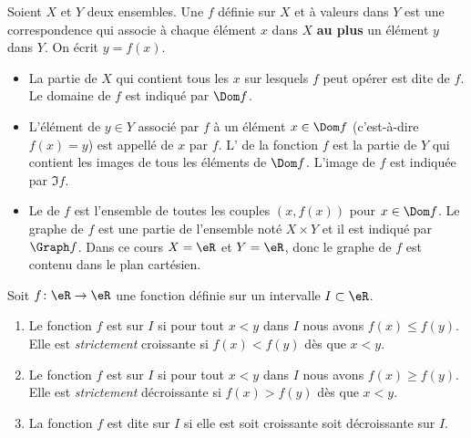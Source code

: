 \begin{definition}
  Soient $X$ et $Y$ deux ensembles. Une  $f$ définie sur $X$ et à valeurs dans $Y$ est une correspondence qui associe à chaque élément $x$ dans $X$ {\bf au plus} un élément $y$ dans $Y$. On écrit $y= f(x)$.
  \begin{itemize}
  \item La partie de $X$ qui contient tous les $x$ sur lesquels $f$ peut opérer est dite  de $f$. Le domaine de $f$ est indiqué par $\Dom f$.
  \item L'élément de $y\in Y$ associé par $f$ à un élément $x\in \Dom f$ (c'est-à-dire $f(x) = y$)  est appellé  de $x$ par $f$. L' de la fonction $f$ est la partie de $Y$ qui contient les images de tous les éléments de $\Dom f$. L'image de $f$ est indiquée par $\Im f$.
  \item Le  de $f$ est l'ensemble de toutes les couples $(x, f(x))$ pour $x\in \Dom f$. Le graphe de $f$ est une partie de l'ensemble noté $X\times Y$ et il est indiqué par $\Graph f$. Dans ce cours $X = \eR$ et $Y = \eR$, donc le graphe de $f$ est contenu dans le plan cartésien.
  \end{itemize}
\end{definition}

\begin{definition}
    Soit \( f\colon \eR\to \eR\) une fonction définie sur un intervalle \( I\subset \eR\).
    \begin{enumerate}
        \item
            Le fonction \( f\) est  sur \( I\) si pour tout \( x<y\) dans \( I\) nous avons \( f(x)\leq f(y)\). Elle est \emph{strictement} croissante si \( f(x)<f(y)\) dès que \( x<y\).
        \item
            Le fonction \( f\) est  sur \( I\) si pour tout \( x<y\) dans \( I\) nous avons \( f(x)\geq f(y)\). Elle est \emph{strictement} décroissante si \( f(x)>f(y)\) dès que \( x<y\).
        \item
            La fonction \( f\) est dite  sur \( I\) si elle est soit croissante soit décroissante sur \( I\).
    \end{enumerate}
\end{definition}


